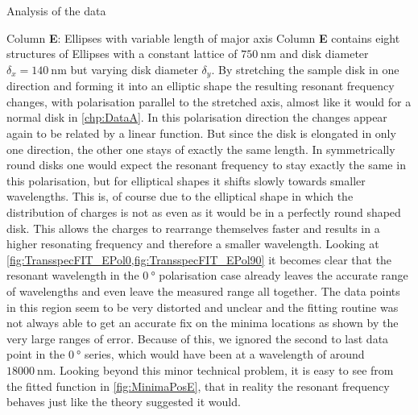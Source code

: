 \documentclass[pdftex, a4paper,11pt, twoside, UKenglish]{report}
\begin{document}
\begin{chapter}{Analysis of the data}
    \newpage
    \begin{section}{Column \textbf{E}: Ellipses with variable length of
        major axis}
      \label{chp:DataE}
      Column \textbf{E} contains eight structures of Ellipses with a constant
      lattice of $\SI{750}{\nano\meter}$ and disk diameter
      $\delta_{x} = \SI{140}{\nano\meter}$ but varying disk diameter
      $\delta_{y}$. \newline
      By stretching the sample disk in one direction and forming it into an
      elliptic shape the resulting resonant frequency changes, with polarisation
      parallel to the stretched axis, almost like it would for a normal disk
      in \cref{chp:DataA}. In this polarisation direction the changes appear
      again to be related by a linear function. But since the disk is elongated
      in only one direction, the other one stays of exactly the same length.
      In symmetrically round disks one would expect the resonant frequency to
      stay exactly the same in this polarisation, but for elliptical shapes it
      shifts slowly towards smaller wavelengths. This is, of course due to the
      elliptical shape in which the distribution of charges is not as even as it
      would be in a perfectly round shaped disk. This allows the charges to
      rearrange themselves faster and results in a higher resonating frequency
      and therefore a smaller wavelength.\newline
      Looking at \cref{fig:TransspecFIT_EPol0,fig:TransspecFIT_EPol90} it
      becomes clear that the resonant wavelength in the $\SI{0}{\degree}$
      polarisation case already leaves the accurate range of wavelengths and
      even leave the measured range all together.
      The data points in this region seem to be very distorted and unclear and
      the fitting routine was not always able to get an accurate fix on the
      minima locations as shown by the very large ranges of error. Because of
      this, we ignored the second to last data point in the $\SI{0}{\degree}$
      series, which would have been at a wavelength of around
      $\SI{18000}{\nano\meter}$. Looking beyond this minor technical problem,
      it is easy to see from the fitted function in \cref{fig:MinimaPosE},
      that in reality the resonant frequency behaves just like the theory
      suggested it would.
      
      

\end{section}
\end{chapter}
\end{document}
